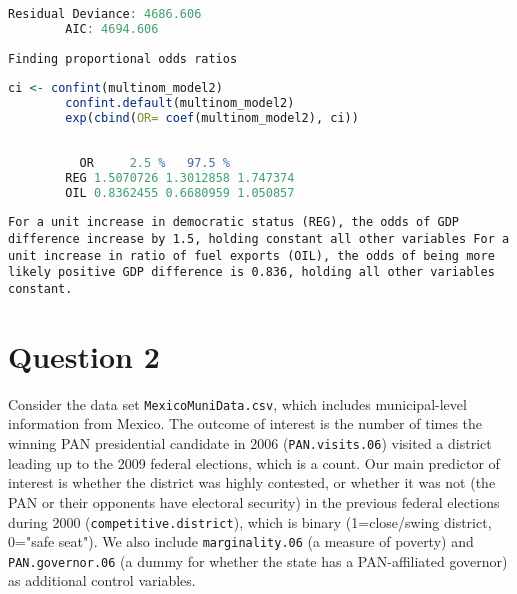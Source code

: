 \documentclass[12pt,letterpaper]{article}
\begin{document}
\begin{enumerate}
\begin{lstlisting}[language=R]
		Residual Deviance: 4686.606 
		AIC: 4694.606
	\end{lstlisting}

\newline\texttt{Finding proportional odds ratios}
	\begin{lstlisting}[language=R]
		ci <- confint(multinom_model2)
		confint.default(multinom_model2)
		exp(cbind(OR= coef(multinom_model2), ci))
		
		
		  OR     2.5 %   97.5 %
		REG 1.5070726 1.3012858 1.747374
		OIL 0.8362455 0.6680959 1.050857
	\end{lstlisting}

\newline\texttt{For a unit increase in democratic status (REG), the odds of GDP difference increase
	by 1.5, holding constant all other variables
	 For a unit increase in ratio of fuel exports (OIL),
	 the odds of being more likely positive GDP difference is 
	 0.836, holding all other variables constant.}
	
\end{enumerate}

\section*{Question 2} 
\vspace{.25cm}

\noindent Consider the data set \texttt{MexicoMuniData.csv}, which includes municipal-level information from Mexico. The outcome of interest is the number of times the winning PAN presidential candidate in 2006 (\texttt{PAN.visits.06}) visited a district leading up to the 2009 federal elections, which is a count. Our main predictor of interest is whether the district was highly contested, or whether it was not (the PAN or their opponents have electoral security) in the previous federal elections during 2000 (\texttt{competitive.district}), which is binary (1=close/swing district, 0="safe seat"). We also include \texttt{marginality.06} (a measure of poverty) and \texttt{PAN.governor.06} (a dummy for whether the state has a PAN-affiliated governor) as additional control variables. 
\end{document}
